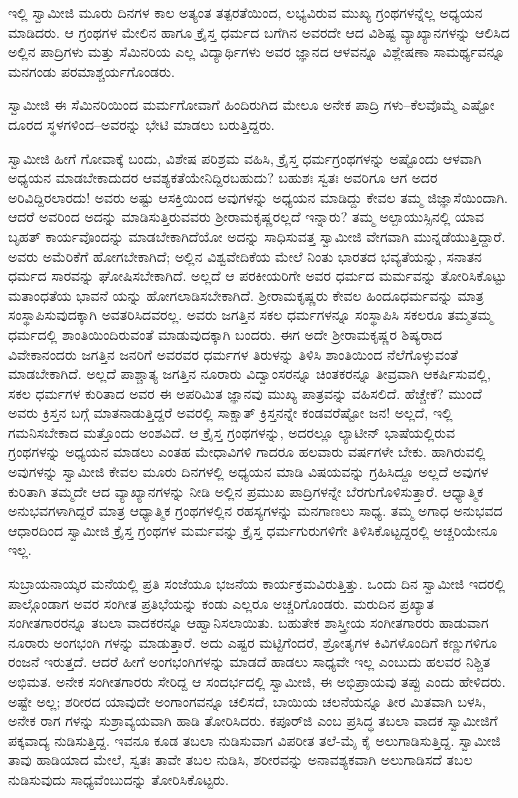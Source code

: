 ಇಲ್ಲಿ ಸ್ವಾಮೀಜಿ ಮೂರು ದಿನಗಳ ಕಾಲ ಅತ್ಯಂತ ತತ್ಪರತೆಯಿಂದ, ಲಭ್ಯವಿರುವ ಮುಖ್ಯ ಗ್ರಂಥಗಳನ್ನೆಲ್ಲ ಅಧ್ಯಯನ ಮಾಡಿದರು. ಆ ಗ್ರಂಥಗಳ ಮೇಲಿನ ಹಾಗೂ ಕ್ರೈಸ್ತ ಧರ್ಮದ ಬಗೆಗಿನ ಅವರದೇ ಆದ ವಿಶಿಷ್ಟ ವ್ಯಾಖ್ಯಾನಗಳನ್ನು ಆಲಿಸಿದ ಅಲ್ಲಿನ ಪಾದ್ರಿಗಳು ಮತ್ತು ಸೆಮಿನರಿಯ ಎಲ್ಲ ವಿದ್ಯಾರ್ಥಿಗಳು ಅವರ ಜ್ಞಾನದ ಆಳವನ್ನೂ ವಿಶ್ಲೇಷಣಾ ಸಾಮರ್ಥ್ಯವನ್ನೂ ಮನಗಂಡು ಪರಮಾಶ್ಚರ್ಯಗೊಂಡರು.

ಸ್ವಾಮೀಜಿ ಈ ಸೆಮಿನರಿಯಿಂದ ಮರ್ಮಗೋವಾಗೆ ಹಿಂದಿರುಗಿದ ಮೇಲೂ ಅನೇಕ ಪಾದ್ರಿ ಗಳು–ಕೆಲವೊಮ್ಮೆ ಎಷ್ಟೋ ದೂರದ ಸ್ಥಳಗಳಿಂದ–ಅವರನ್ನು ಭೇಟಿ ಮಾಡಲು ಬರುತ್ತಿದ್ದರು.

ಸ್ವಾಮೀಜಿ ಹೀಗೆ ಗೋವಾಕ್ಕೆ ಬಂದು, ವಿಶೇಷ ಪರಿಶ್ರಮ ವಹಿಸಿ, ಕ್ರೈಸ್ತ ಧರ್ಮಗ್ರಂಥಗಳನ್ನು ಅಷ್ಟೊಂದು ಆಳವಾಗಿ ಅಧ್ಯಯನ ಮಾಡಬೇಕಾದುದರ ಆವಶ್ಯಕತೆಯೇನಿದ್ದಿರಬಹುದು? ಬಹುಶಃ ಸ್ವತಃ ಅವರಿಗೂ ಆಗ ಅದರ ಅರಿವಿದ್ದಿರಲಾರದು! ಅವರು ಅಷ್ಟು ಆಸಕ್ತಿಯಿಂದ ಅವುಗಳನ್ನು ಅಧ್ಯಯನ ಮಾಡಿದ್ದು ಕೇವಲ ತಮ್ಮ ಜಿಜ್ಞಾಸೆಯಿಂದಾಗಿ. ಆದರೆ ಅವರಿಂದ ಅದನ್ನು ಮಾಡಿಸುತ್ತಿರುವವರು ಶ್ರೀರಾಮಕೃಷ್ಣರಲ್ಲದೆ ಇನ್ನಾರು? ತಮ್ಮ ಅಲ್ಪಾಯುಸ್ಸಿನಲ್ಲಿ ಯಾವ ಬೃಹತ್ ಕಾರ್ಯವೊಂದನ್ನು ಮಾಡಬೇಕಾಗಿದೆಯೋ ಅದನ್ನು ಸಾಧಿಸುವತ್ತ ಸ್ವಾಮೀಜಿ ವೇಗವಾಗಿ ಮುನ್ನಡೆಯುತ್ತಿದ್ದಾರೆ. ಅವರು ಅಮೆರಿಕೆಗೆ ಹೋಗಬೇಕಾಗಿದೆ; ಅಲ್ಲಿನ ವಿಶ್ವವೇದಿಕೆಯ ಮೇಲೆ ನಿಂತು ಭಾರತದ ಭವ್ಯತೆಯನ್ನು, ಸನಾತನ ಧರ್ಮದ ಸಾರವನ್ನು ಘೋಷಿಸಬೇಕಾಗಿದೆ. ಅಲ್ಲದೆ ಆ ಪರಕೀಯರಿಗೇ ಅವರ ಧರ್ಮದ ಮರ್ಮವನ್ನು ತೋರಿಸಿಕೊಟ್ಟು ಮತಾಂಧತೆಯ ಭಾವನೆ ಯನ್ನು ಹೋಗಲಾಡಿಸಬೇಕಾಗಿದೆ. ಶ್ರೀರಾಮಕೃಷ್ಣರು ಕೇವಲ ಹಿಂದೂಧರ್ಮವನ್ನು ಮಾತ್ರ ಸಂಸ್ಥಾಪಿಸುವುದಕ್ಕಾಗಿ ಅವತರಿಸಿದವರಲ್ಲ. ಅವರು ಜಗತ್ತಿನ ಸಕಲ ಧರ್ಮಗಳನ್ನೂ ಸಂಸ್ಥಾಪಿಸಿ ಸಕಲರೂ ತಮ್ಮತಮ್ಮ ಧರ್ಮದಲ್ಲಿ ಶಾಂತಿಯಿಂದಿರುವಂತೆ ಮಾಡುವುದಕ್ಕಾಗಿ ಬಂದರು. ಈಗ ಅದೇ ಶ್ರೀರಾಮಕೃಷ್ಣರ ಶಿಷ್ಯರಾದ ವಿವೇಕಾನಂದರು ಜಗತ್ತಿನ ಜನರಿಗೆ ಅವರವರ ಧರ್ಮಗಳ ತಿರುಳನ್ನು ತಿಳಿಸಿ ಶಾಂತಿಯಿಂದ ನೆಲೆಗೊಳ್ಳುವಂತೆ ಮಾಡಬೇಕಾಗಿದೆ. ಅಲ್ಲದೆ ಪಾಶ್ಚಾತ್ಯ ಜಗತ್ತಿನ ನೂರಾರು ವಿದ್ವಾಂಸರನ್ನೂ ಚಿಂತಕರನ್ನೂ ತೀವ್ರವಾಗಿ ಆಕರ್ಷಿಸುವಲ್ಲಿ, ಸಕಲ ಧರ್ಮಗಳ ಕುರಿತಾದ ಅವರ ಈ ಅಪರಿಮಿತ ಜ್ಞಾನವು ಮುಖ್ಯ ಪಾತ್ರವನ್ನು ವಹಿಸಲಿದೆ. ಹೆಚ್ಚೇಕೆ? ಮುಂದೆ ಅವರು ಕ್ರಿಸ್ತನ ಬಗ್ಗೆ ಮಾತನಾಡುತ್ತಿದ್ದರೆ ಅವರಲ್ಲಿ ಸಾಕ್ಷಾತ್ ಕ್ರಿಸ್ತನನ್ನೇ ಕಂಡವರೆಷ್ಟೋ ಜನ! ಅಲ್ಲದೆ, ಇಲ್ಲಿ ಗಮನಿಸಬೇಕಾದ ಮತ್ತೊಂದು ಅಂಶವಿದೆ. ಆ ಕ್ರೈಸ್ತ ಗ್ರಂಥಗಳನ್ನು, ಅದರಲ್ಲೂ ಲ್ಯಾಟೀನ್ ಭಾಷೆಯಲ್ಲಿರುವ ಗ್ರಂಥಗಳನ್ನು ಅಧ್ಯಯನ ಮಾಡಲು ಎಂತಹ ಮೇಧಾವಿಗಳಿ ಗಾದರೂ ಹಲವಾರು ವರ್ಷಗಳೇ ಬೇಕು. ಹಾಗಿರುವಲ್ಲಿ ಅವುಗಳನ್ನು ಸ್ವಾಮೀಜಿ ಕೇವಲ ಮೂರು ದಿನಗಳಲ್ಲಿ ಅಧ್ಯಯನ ಮಾಡಿ ವಿಷಯವನ್ನು ಗ್ರಹಿಸಿದ್ದೂ ಅಲ್ಲದೆ ಅವುಗಳ ಕುರಿತಾಗಿ ತಮ್ಮದೇ ಆದ ವ್ಯಾಖ್ಯಾನಗಳನ್ನು ನೀಡಿ ಅಲ್ಲಿನ ಪ್ರಮುಖ ಪಾದ್ರಿಗಳನ್ನೇ ಬೆರಗುಗೊಳಿಸುತ್ತಾರೆ. ಆಧ್ಯಾತ್ಮಿಕ ಅನುಭವಗಳಾಗಿದ್ದರೆ ಮಾತ್ರ ಆಧ್ಯಾತ್ಮಿಕ ಗ್ರಂಥಗಳಲ್ಲಿನ ರಹಸ್ಯಗಳನ್ನು ಮನಗಾಣಲು ಸಾಧ್ಯ. ತಮ್ಮ ಅಗಾಧ ಅನುಭವದ ಆಧಾರದಿಂದ ಸ್ವಾಮೀಜಿ ಕ್ರೈಸ್ತ ಗ್ರಂಥಗಳ ಮರ್ಮವನ್ನು ಕ್ರೈಸ್ತ ಧರ್ಮಗುರುಗಳಿಗೇ ತಿಳಿಸಿಕೊಟ್ಟದ್ದರಲ್ಲಿ ಅಚ್ಚರಿಯೇನೂ ಇಲ್ಲ.

ಸುಬ್ರಾಯನಾಯ್ಕರ ಮನೆಯಲ್ಲಿ ಪ್ರತಿ ಸಂಜೆಯೂ ಭಜನೆಯ ಕಾರ್ಯಕ್ರಮವಿರುತ್ತಿತ್ತು. ಒಂದು ದಿನ ಸ್ವಾಮೀಜಿ ಇದರಲ್ಲಿ ಪಾಲ್ಗೊಂಡಾಗ ಅವರ ಸಂಗೀತ ಪ್ರತಿಭೆಯನ್ನು ಕಂಡು ಎಲ್ಲರೂ ಅಚ್ಚರಿಗೊಂಡರು. ಮರುದಿನ ಪ್ರಖ್ಯಾತ ಸಂಗೀತಗಾರರನ್ನೂ ತಬಲಾ ವಾದಕರನ್ನೂ ಆಹ್ವಾನಿಸಲಾಯಿತು. ಬಹುತೇಕ ಶಾಸ್ತ್ರೀಯ ಸಂಗೀತಗಾರರು ಹಾಡುವಾಗ ನೂರಾರು ಅಂಗಭಂಗಿ ಗಳನ್ನು ಮಾಡುತ್ತಾರೆ. ಅದು ಎಷ್ಟರ ಮಟ್ಟಿಗೆಂದರೆ, ಶ್ರೋತೃಗಳ ಕಿವಿಗಳೊಂದಿಗೆ ಕಣ್ಣುಗಳಿಗೂ ರಂಜನೆ ಇರುತ್ತದೆ. ಆದರೆ ಹೀಗೆ ಅಂಗಭಂಗಿಗಳನ್ನು ಮಾಡದೆ ಹಾಡಲು ಸಾಧ್ಯವೇ ಇಲ್ಲ ಎಂಬುದು ಹಲವರ ನಿಶ್ಚಿತ ಅಭಿಮತ. ಅನೇಕ ಸಂಗೀತಗಾರರು ಸೇರಿದ್ದ ಆ ಸಂದರ್ಭದಲ್ಲಿ ಸ್ವಾಮೀಜಿ, ಈ ಅಭಿಪ್ರಾಯವು ತಪ್ಪು ಎಂದು ಹೇಳಿದರು. ಅಷ್ಟೇ ಅಲ್ಲ; ಶರೀರದ ಯಾವುದೇ ಅಂಗಾಂಗವನ್ನೂ ಚಲಿಸದೆ, ಬಾಯಿಯ ಚಲನೆಯನ್ನೂ ತೀರ ಮಿತವಾಗಿ ಬಳಸಿ, ಅನೇಕ ರಾಗ ಗಳನ್ನು ಸುಶ್ರಾವ್ಯಯವಾಗಿ ಹಾಡಿ ತೋರಿಸಿದರು. ಕಪೂರ್​ಜಿ ಎಂಬ ಪ್ರಸಿದ್ಧ ತಬಲಾ ವಾದಕ ಸ್ವಾಮೀಜಿಗೆ ಪಕ್ಕವಾದ್ಯ ನುಡಿಸುತ್ತಿದ್ದ. ಇವನೂ ಕೂಡ ತಬಲಾ ನುಡಿಸುವಾಗ ವಿಪರೀತ ತಲೆ-ಮೈ ಕೈ ಅಲುಗಾಡಿಸುತ್ತಿದ್ದ. ಸ್ವಾಮೀಜಿ ತಾವು ಹಾಡಿಯಾದ ಮೇಲೆ, ಸ್ವತಃ ತಾವೇ ತಬಲ ನುಡಿಸಿ, ಶರೀರವನ್ನು ಅನಾವಶ್ಯಕವಾಗಿ ಅಲುಗಾಡಿಸದೆ ತಬಲ ನುಡಿಸುವುದು ಸಾಧ್ಯವೆಂಬುದನ್ನು ತೋರಿಸಿಕೊಟ್ಟರು.

